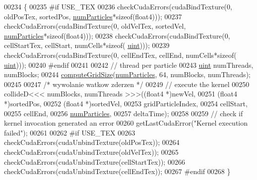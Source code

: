 \begin{DoxyCode}
00234     \{
00235 \textcolor{preprocessor}{#if USE\_TEX}
00236 \textcolor{preprocessor}{}        checkCudaErrors(cudaBindTexture(0, oldPosTex, sortedPos, \hyperlink{particles_8cpp_a05b8a90212054a3eb1a036ae0c269596}{numParticles}*\textcolor{keyword}{sizeof}(float4)));
00237         checkCudaErrors(cudaBindTexture(0, oldVelTex, sortedVel, \hyperlink{particles_8cpp_a05b8a90212054a3eb1a036ae0c269596}{numParticles}*\textcolor{keyword}{sizeof}(float4)));
00238         checkCudaErrors(cudaBindTexture(0, cellStartTex, cellStart, numCells*\textcolor{keyword}{sizeof}(
      \hyperlink{particles__kernel_8cuh_a91ad9478d81a7aaf2593e8d9c3d06a14}{uint})));
00239         checkCudaErrors(cudaBindTexture(0, cellEndTex, cellEnd, numCells*\textcolor{keyword}{sizeof}(
      \hyperlink{particles__kernel_8cuh_a91ad9478d81a7aaf2593e8d9c3d06a14}{uint})));
00240 \textcolor{preprocessor}{#endif}
00241 \textcolor{preprocessor}{}
00242         \textcolor{comment}{// thread per particle}
00243         \hyperlink{particles__kernel_8cuh_a91ad9478d81a7aaf2593e8d9c3d06a14}{uint} numThreads, numBlocks;
00244         \hyperlink{particle_system__cuda_8cu_a78e8aa50e0629b57cff219a2fa753ed0}{computeGridSize}(\hyperlink{particles_8cpp_a05b8a90212054a3eb1a036ae0c269596}{numParticles}, 64, numBlocks, numThreads);
00245 
00247 \textcolor{comment}{/*      wywolanie watkow zderzen        */}
00249         \textcolor{comment}{// execute the kernel}
00250         collideD<<< numBlocks, numThreads >>>((float4 *)newVel,
00251                                               (float4 *)sortedPos,
00252                                               (float4 *)sortedVel,
00253                                               gridParticleIndex,
00254                                               cellStart,
00255                                               cellEnd,
00256                                               \hyperlink{particles_8cpp_a05b8a90212054a3eb1a036ae0c269596}{numParticles},
00257                                                                                           deltaTime);
00258 
00259         \textcolor{comment}{// check if kernel invocation generated an error}
00260         getLastCudaError("Kernel execution failed");
00261 
00262 \textcolor{preprocessor}{#if USE\_TEX}
00263 \textcolor{preprocessor}{}        checkCudaErrors(cudaUnbindTexture(oldPosTex));
00264         checkCudaErrors(cudaUnbindTexture(oldVelTex));
00265         checkCudaErrors(cudaUnbindTexture(cellStartTex));
00266         checkCudaErrors(cudaUnbindTexture(cellEndTex));
00267 \textcolor{preprocessor}{#endif}
00268 \textcolor{preprocessor}{}    \}
\end{DoxyCode}


